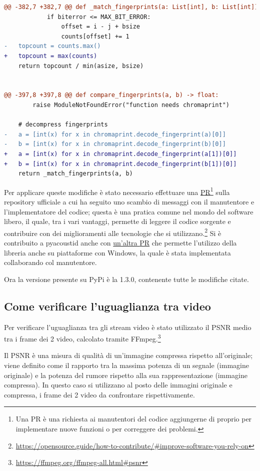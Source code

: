 \begin{lstlisting}[language=diff]
@@ -382,7 +382,7 @@ def _match_fingerprints(a: List[int], b: List[int]) -> float:
            if biterror <= MAX_BIT_ERROR:
                offset = i - j + bsize
                counts[offset] += 1
-   topcount = counts.max()
+   topcount = max(counts)
    return topcount / min(asize, bsize)


@@ -397,8 +397,8 @@ def compare_fingerprints(a, b) -> float:
        raise ModuleNotFoundError("function needs chromaprint")

    # decompress fingerprints
-   a = [int(x) for x in chromaprint.decode_fingerprint(a)[0]]
-   b = [int(x) for x in chromaprint.decode_fingerprint(b)[0]]
+   a = [int(x) for x in chromaprint.decode_fingerprint(a[1])[0]]
+   b = [int(x) for x in chromaprint.decode_fingerprint(b[1])[0]]
    return _match_fingerprints(a, b)
\end{lstlisting}

Per applicare queste modifiche è stato necessario effettuare una \href{https://github.com/beetbox/pyacoustid/pull/78}{\ac{PR}}\footnote{Una \ac{PR} è una richiesta ai manutentori del codice aggiungerne di proprio per implementare nuove funzioni o per correggere dei problemi.} sulla repository ufficiale a cui ha seguito uno scambio di messaggi con il manutentore e l'implementatore del codice; questa è una pratica comune nel mondo del software libero, il quale, tra i vari vantaggi, permette di leggere il codice sorgente e contribuire con dei miglioramenti alle tecnologie che si utilizzano.\footnote{\url{https://opensource.guide/how-to-contribute/\#improve-software-you-rely-on}}
Si è contribuito a pyacoustid anche con \href{https://github.com/beetbox/pyacoustid/pull/79}{un'altra \ac{PR}} che permette l'utilizzo della libreria anche su piattaforme con Windows, la quale è stata implementata collaborando col manutentore.

Ora la versione presente su PyPi è la 1.3.0, contenente tutte le modifiche citate.


\subsection{Come verificare l'uguaglianza tra video} \label{ssec:packager-video}    %
Per verificare l'uguaglianza tra gli stream video è stato utilizzato il \ac{PSNR} medio tra i frame dei 2 video, calcolato tramite FFmpeg.\footnote{\url{https://ffmpeg.org/ffmpeg-all.html\#psnr}}

Il \ac{PSNR} è una misura di qualità di un'immagine compressa rispetto all'originale; viene definito come il rapporto tra la massima potenza di un segnale (immagine originale) e la potenza del rumore rispetto alla sua rappresentazione (immagine compressa).
In questo caso si utilizzano al posto delle immagini originale e compressa, i frame dei 2 video da confrontare rispettivamente.

